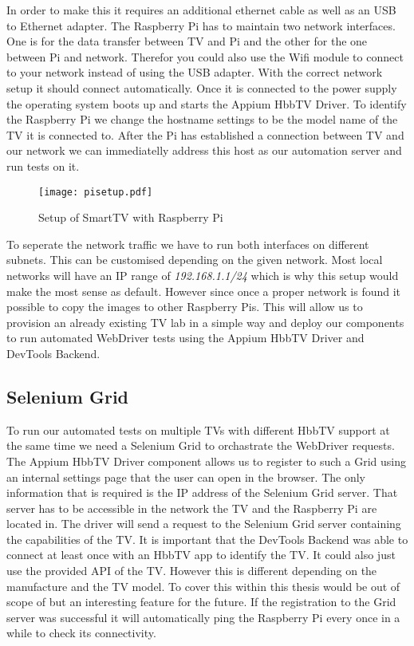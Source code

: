 In order to make this it requires an additional ethernet cable as well as an USB to Ethernet adapter.
The Raspberry Pi has to maintain two network interfaces. One is for the data transfer between TV
and Pi and the other for the one between Pi and network. Therefor you could also use the Wifi module
to connect to your network instead of using the USB adapter. With the correct network setup it should
connect automatically. Once it is connected to the power supply the operating system boots up and
starts the Appium HbbTV Driver. To identify the Raspberry Pi we change the hostname settings to be
the model name of the TV it is connected to. After the Pi has established a connection between TV
and our network we can immediatelly address this host as our automation server and run tests on it.

\vspace{1cm}
\begin{figure}[htb]
  \centering
  \texttt{[image: pisetup.pdf]}\\
  \caption{Setup of SmartTV with Raspberry Pi}\label{fig:pisetup}
\end{figure}
\vspace{0.5cm}

To seperate the network traffic we have to run both interfaces on different subnets. This can be
customised depending on the given network. Most local networks will have an IP range of
\textit{192.168.1.1/24} which is why this setup would make the most sense as default. However since
once a proper network is found it possible to copy the images to other Raspberry Pis. This will
allow us to provision an already existing TV lab in a simple way and deploy our components to run
automated WebDriver tests using the Appium HbbTV Driver and DevTools Backend.

\subsection{Selenium Grid\label{sec:grid}}

To run our automated tests on multiple TVs with different HbbTV support at the same time we need
a Selenium Grid to orchastrate the WebDriver requests. The Appium HbbTV Driver component allows us
to register to such a Grid using an internal settings page that the user can open in the browser.
The only information that is required is the IP address of the Selenium Grid server. That server
has to be accessible in the network the TV and the Raspberry Pi are located in. The driver will send
a request to the Selenium Grid server containing the capabilities of the TV. It is important that
the DevTools Backend was able to connect at least once with an HbbTV app to identify the TV. It
could also just use the provided API of the TV. However this is different depending on the manufacture
and the TV model. To cover this within this thesis would be out of scope of but an interesting
feature for the future. If the registration to the Grid server was successful it will automatically
ping the Raspberry Pi every once in a while to check its connectivity.

